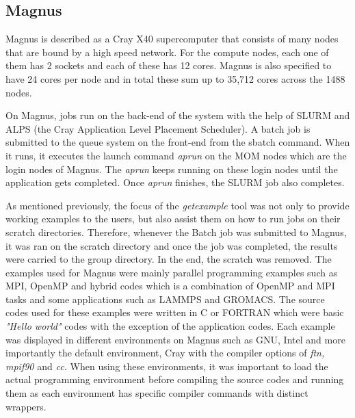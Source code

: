 \subsection{Magnus}

Magnus is described as a Cray X40 supercomputer that consists of many nodes that are bound by a high speed network. For the compute nodes, each one 
of them has 2 sockets and each of these has 12 cores. Magnus is also specified to have 24 cores per node and in total these sum up to 35,712 cores across 
the 1488 nodes. 

On Magnus, jobs run on the back-end of the system with the help of SLURM and ALPS (the Cray Application Level Placement Scheduler). A batch job is 
submitted to the queue system on the front-end from the sbatch command. When it runs, it executes the launch command \emph{aprun} on the MOM nodes 
which are the login nodes of Magnus. The \emph{aprun} keeps running on these login nodes until the application gets completed. Once \emph{aprun} finishes, the 
SLURM job also completes.

As mentioned previously, the focus of the \emph{getexample} tool was not only to provide working examples to the users, but also assist them on how to run jobs
on their scratch directories. Therefore, whenever the Batch job was submitted to Magnus, it was ran on the scratch directory and once the job was 
completed, the results were carried to the group directory. In the end, the scratch was removed. The examples used for Magnus were mainly parallel
programming examples such as MPI, OpenMP and hybrid codes which is a combination of OpenMP and MPI tasks and some applications such as LAMMPS and GROMACS.
The source codes used for these examples were written in C or FORTRAN which were basic \emph{"Hello world"} codes with the exception of the application codes.
Each example was displayed in different environments on Magnus such as GNU, Intel and more importantly the default environment, Cray with the compiler
options of \emph{ftn, mpif90} and \emph{cc.} When using these environments, it was important to load the actual programming environment before compiling the source
codes and running them as each environment has specific compiler commands with distinct wrappers.

